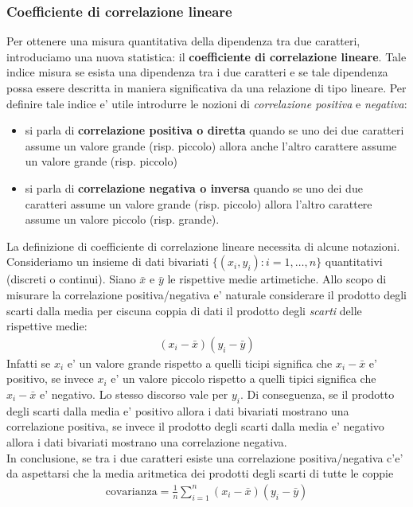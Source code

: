 \documentclass[a4paper,12pt]{article}
\begin{document}
\subsubsection{Coefficiente di correlazione lineare}
Per ottenere una misura quantitativa della dipendenza tra due caratteri, introduciamo una nuova statistica: il \textbf{coefficiente di correlazione lineare}.
Tale indice
misura se esista una dipendenza tra i due caratteri e se tale dipendenza possa essere
descritta in maniera significativa da una relazione di tipo lineare. Per definire tale indice
e' utile introdurre le nozioni di \textit{correlazione positiva} e \textit{negativa}:
\begin{itemize}
  \item si parla di \textbf{correlazione positiva o diretta} quando se uno dei due caratteri assume
un valore grande (risp. piccolo) allora anche l’altro carattere assume un valore
grande (risp. piccolo)
  \item si parla di \textbf{correlazione negativa o inversa} quando se uno dei due caratteri
assume un valore grande (risp. piccolo) allora l’altro carattere assume un valore
piccolo (risp. grande).
\end{itemize}
La definizione di coefficiente di correlazione lineare necessita di alcune notazioni.\\
Consideriamo un insieme di dati bivariati $\{(x_i, y_i) : i=1,\ldots,n\}$ quantitativi (discreti o continui). Siano $\bar{x}$ e $\bar{y}$ le rispettive medie artimetiche. Allo scopo di misurare la correlazione positiva/negativa e' naturale considerare il prodotto degli scarti dalla media per ciscuna coppia di dati il prodotto degli \textit{scarti} delle rispettive medie:
\begin{align*}
  (x_i - \bar{x})(y_i - \bar{y})
\end{align*}
Infatti se $x_i$ e' un valore grande rispetto a quelli ticipi significa che $x_i - \bar{x}$ e' positivo, se invece $x_i$ e' un valore piccolo rispetto a quelli tipici significa che $x_i - \bar{x}$ e' negativo. Lo stesso discorso vale per $y_i$. Di conseguenza, se il prodotto degli scarti dalla media e' positivo allora i dati bivariati mostrano una correlazione positiva, se invece il prodotto degli scarti dalla media e' negativo allora i dati bivariati mostrano una correlazione negativa.\\
In conclusione, se tra i due caratteri esiste una correlazione positiva/negativa c’e' da
aspettarsi che la media aritmetica dei prodotti degli scarti di tutte le coppie
\begin{align*}
  \text{covarianza} = \frac{1}{n} \sum_{i=1}^{n} (x_i - \bar{x})(y_i - \bar{y})
\end{align*}
\end{document}
